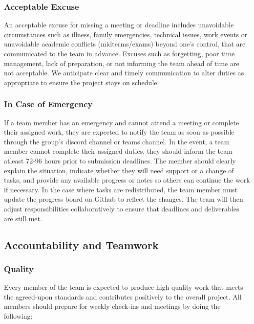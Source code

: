 \documentclass{article}
\begin{document}
\subsubsection*{Acceptable Excuse}

An acceptable excuse for missing a meeting or deadline includes unavoidable circumstances 
such as illness, family emergencies, technical issues, work events or unavoidable academic conflicts (midterms/exams) beyond one’s control,
that are communicated to the team in advance.
Excuses such as forgetting, poor time management, lack of preparation, or not informing the team
ahead of time are not acceptable. We anticipate clear and timely communication to alter duties as
appropriate to ensure the project stays on schedule. 

\subsubsection*{In Case of Emergency}

If a team member has an emergency and cannot attend a meeting or complete their assigned work, they 
are expected to notify the team as soon as possible through the group’s discord channel or teams channel. In the event, 
a team member cannot complete their assigned duties, they should inform the team atleast 72-96 hours prior to submission deadlines.
The member should clearly explain the situation, indicate whether they will need support or a change 
of tasks, and provide any available progress or notes so others can continue the work if necessary. In the case where tasks are redistributed,
the team member must update the progress board on Github to reflect the changes. 
The team will then adjust responsibilities collaboratively to ensure that deadlines and deliverables are still met.

\subsection*{Accountability and Teamwork}

\subsubsection*{Quality} 

Every member of the team is expected to produce high-quality work that meets the agreed-upon standards and contributes positively to the 
overall project. All members should prepare for weekly check-ins and meetings by doing the
following:
\end{document}
